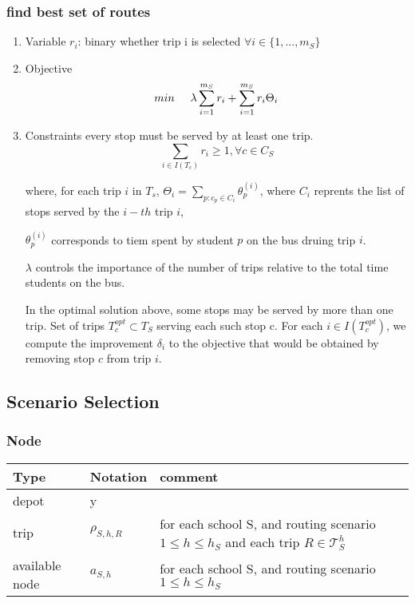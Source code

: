\subsubsection{find best set of routes}
\label{sec:org136df00}
\begin{enumerate}
\item Variable
\label{sec:org024dd7f}
\(r_i\): binary whether trip i is selected \(\forall i \in \{1,...,m_S\}\)

\item Objective
\label{sec:org57ac947}
$$ min \hspace{0.5cm} \lambda \sum_{i=1}^{m_S} r_i + \sum_{i=1}^{m_S} r_i \Theta_i $$

\item Constraints
\label{sec:orgc9ed058}
 every stop must be served by at least one trip. 
$$\sum_{i \in I(T_c)} r_i \ge 1, \forall c \in C_S$$ 

where, for each trip \(i\) in \(T_s\), \(\Theta_i = \sum_{p:c_p \in C_i}
     \theta_p^{(i)}\), where \(C_i\) reprents the list of stops served by the
\(i-th\) trip \(i\),

\(\theta_p^{(i)}\) corresponds to tiem spent by student \(p\) on the bus druing
trip \(i\).

\(\lambda\) controls the importance of the number of trips relative to the
total time students on the bus.

In the optimal solution above, some stops may be served by more than one trip. 
Set of trips \(T_c^{opt} \subset T_S\) serving each such stop c. For each
\(i\in I(T_c^{opt})\), we compute the improvement \(\delta_i\) to the objective
that would be obtained by removing stop \(c\) from trip \(i\).
\end{enumerate}






\subsection{Scenario Selection}
\label{sec:org4f584c9}

\subsubsection{Node}
\label{sec:org09d2624}

\begin{center}
\begin{tabular}{lll}
Type & Notation & comment\\
\hline
depot & y & \\
trip & \(\rho_{S,h,R}\) & for each school S, and routing scenario \(1 \le h \le h_S\) and each trip \(R \in \mathcal{T}_S^h\)\\
available node & \(a_{S,h}\) & for each school S, and routing scenario \(1 \le h \le h_S\)\\
\end{tabular}
\end{center}


